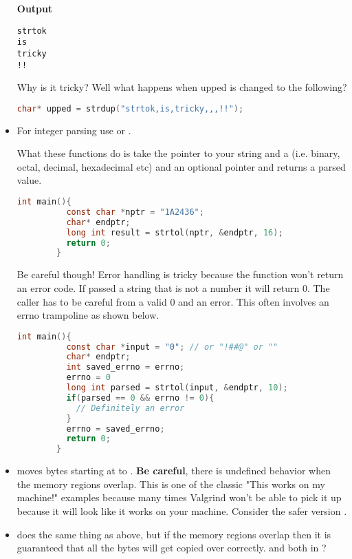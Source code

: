 \begin{itemize}
	      \textbf{Output}

	      \begin{lstlisting}[language=console]
strtok
is
tricky
!!
\end{lstlisting}

	      Why is it tricky? Well what happens when upped is changed to the following?

	      \begin{lstlisting}[language=C]
        char* upped = strdup("strtok,is,tricky,,,!!");
\end{lstlisting}

	\item For integer parsing use
	      or
	      .

	      What these functions do is take the pointer to your string
	       and a  (i.e. binary, octal, decimal,
	      hexadecimal etc) and an optional pointer  and returns a
	      parsed value.

	      \begin{lstlisting}[language=C]
        int main(){
          const char *nptr = "1A2436";
          char* endptr;
          long int result = strtol(nptr, &endptr, 16);
          return 0;
        }
\end{lstlisting}

	      Be careful though!
        Error handling is tricky because the function won't return an error code.
        If passed a string that is not a number it will return 0.
        The caller has to be careful from a valid 0 and an error.
        This often involves an errno trampoline as shown below.

	      \begin{lstlisting}[language=C]
        int main(){
          const char *input = "0"; // or "!##@" or ""
          char* endptr;
          int saved_errno = errno;
          errno = 0
          long int parsed = strtol(input, &endptr, 10);
          if(parsed == 0 && errno != 0){
            // Definitely an error
          }
          errno = saved_errno;
          return 0;
        }
\end{lstlisting}

	    \item {} moves  bytes starting at  to .
        \textbf{Be careful}, there is undefined behavior when the memory regions overlap.
        This is one of the classic "This works on my machine!" examples because many times Valgrind won't be able to pick it up because it will look like it works on your machine.
        Consider the safer version .

	    \item {} does the same thing as above, but if the memory regions overlap then it is guaranteed that all the bytes will get copied over correctly.
         and  both in ?
\end{itemize}



